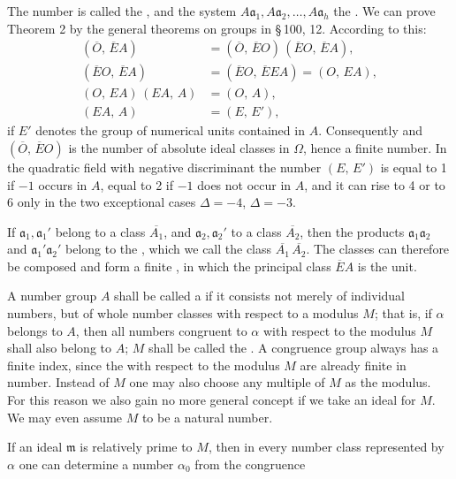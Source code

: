 The number
is called the , and the system
$A\mathfrak{a}_1, A\mathfrak{a}_2, \ldots, A\mathfrak{a}_h$ the . We can prove
Theorem 2 by the general theorems on groups in \S\,100, 12.
According to this:
\[
\begin{aligned}
(\overline{O},\, \overline{E}A) &= (\overline{O},\, \overline{E}O)\,(\overline{E}O,\, \overline{E}A), \\
(\overline{E}O,\, \overline{E}A) &= (\overline{E}O,\, \overline{E}EA) = (O,\, EA), \\
(O,\, EA)\,(EA,\, A) &= (O,\, A), \\
(EA,\, A) &= (E,\, E'),
\end{aligned}
\]
if $E'$ denotes the group of numerical units contained in $A$. Consequently
and $(\overline{O},\, \overline{E}O)$ is the number of absolute ideal classes in $\Omega$, hence
a finite number. In the quadratic field with negative discriminant
the number $(E,\, E')$ is equal to 1 if $-1$ occurs in $A$,
equal to 2 if $-1$ does not occur in $A$, and it can rise to 4 or
to 6 only in the two exceptional cases $\Delta = -4$, $\Delta = -3$.

If $\mathfrak{a}_1, \mathfrak{a}_1'$ belong to a class $\overline{A_1}$, and $\mathfrak{a}_2, \mathfrak{a}_2'$ to a class
$\overline{A_2}$, then the products $\mathfrak{a}_1 \mathfrak{a}_2$ and $\mathfrak{a}_1' \mathfrak{a}_2'$ belong to the , which
we call the class $\overline{A_1}\,\overline{A_2}$. The classes can therefore be composed and
form a finite , in which the
principal class $\overline{E}A$ is the unit.

A number group $A$ shall be called a  if it
consists not merely of individual numbers, but of whole number
classes with respect to a modulus $M$; that is, if $\alpha$ belongs to $A$,
then all numbers congruent to $\alpha$ with respect to the modulus $M$
shall also belong to $A$; $M$ shall be called the .
A congruence group always has a finite index, since
the  with respect to the modulus $M$ are already finite in number.
Instead of $M$ one may also choose any multiple of $M$ as the modulus.
For this reason we also gain no more general concept if
we take an ideal for $M$. We may even assume $M$ to be a natural
number.

If an ideal $\mathfrak{m}$ is relatively prime to $M$, then in
every number class represented by $\alpha$ one can determine a number $\alpha_0$ from the
congruence
